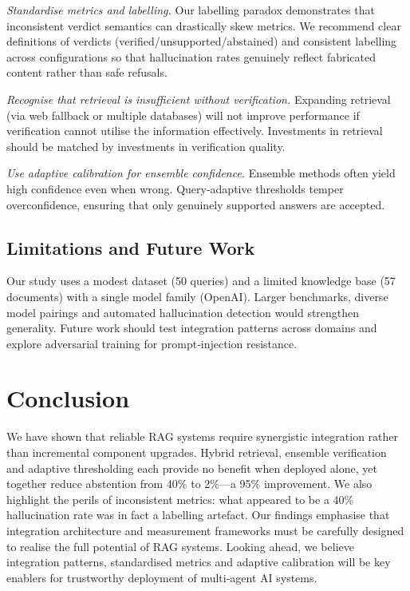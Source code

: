 \documentclass{article}
\begin{document}
\emph{Standardise metrics and labelling.} Our labelling paradox demonstrates that inconsistent verdict semantics can drastically skew metrics. We recommend clear definitions of verdicts (verified/unsupported/abstained) and consistent labelling across configurations so that hallucination rates genuinely reflect fabricated content rather than safe refusals.

\emph{Recognise that retrieval is insufficient without verification.} Expanding retrieval (via web fallback or multiple databases) will not improve performance if verification cannot utilise the information effectively. Investments in retrieval should be matched by investments in verification quality.

\emph{Use adaptive calibration for ensemble confidence.} Ensemble methods often yield high confidence even when wrong. Query‑adaptive thresholds temper overconfidence, ensuring that only genuinely supported answers are accepted.

\subsection{Limitations and Future Work}

Our study uses a modest dataset (50 queries) and a limited knowledge base (57 documents) with a single model family (OpenAI). Larger benchmarks, diverse model pairings and automated hallucination detection would strengthen generality. Future work should test integration patterns across domains and explore adversarial training for prompt‑injection resistance.

\section{Conclusion}
\label{sec:conclusion}

We have shown that reliable RAG systems require synergistic integration rather than incremental component upgrades. Hybrid retrieval, ensemble verification and adaptive thresholding each provide no benefit when deployed alone, yet together reduce abstention from 40\% to 2\%—a 95\% improvement. We also highlight the perils of inconsistent metrics: what appeared to be a 40\% hallucination rate was in fact a labelling artefact. Our findings emphasise that integration architecture and measurement frameworks must be carefully designed to realise the full potential of RAG systems. Looking ahead, we believe integration patterns, standardised metrics and adaptive calibration will be key enablers for trustworthy deployment of multi‑agent AI systems.


   
\end{document}
